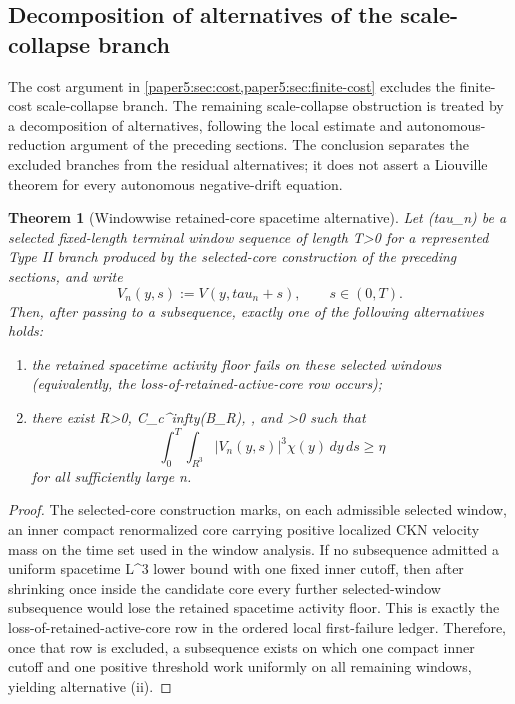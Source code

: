 \documentclass[11pt]{amsart}
\def\({}%
\def\){}%
\def\mathbb#1{#1}%
\def\tau{tau}%
\def\infty{infty}%
\theoremstyle{plain}
\newtheorem{theorem}{Theorem}[section]
\theoremstyle{definition}
\theoremstyle{remark}
\begin{document}
\subsection{Decomposition of alternatives of the scale-collapse branch}
\label{paper5:sec:branch-closure}

The cost argument in \cref{paper5:sec:cost,paper5:sec:finite-cost} excludes the finite-cost scale-collapse branch.  The remaining
scale-collapse obstruction is treated by a decomposition of alternatives, following the local
estimate and autonomous-reduction argument of the preceding sections.  The conclusion separates the excluded branches from the residual alternatives; it does not assert a Liouville theorem for every autonomous negative-drift equation.

\begin{theorem}[Windowwise retained-core spacetime alternative]\label{paper5:thm:core-retention}
Let \((\tau_n)\) be a selected fixed-length terminal window sequence of length \(T>0\) for a represented
Type II branch produced by the selected-core construction of the preceding sections,
and write
\[
  V_n(y,s):=V(y,\tau_n+s),\qquad s\in(0,T).
\]
Then, after passing to a subsequence, exactly one of the following alternatives
holds:
\begin{enumerate}[label=\textup{(\roman*)}]
  \item the retained spacetime activity floor fails on these selected windows
  (equivalently, the loss-of-retained-active-core row occurs);
  \item there exist \(R>0\), \(\chi\in C_c^\infty(B_R)\), \(\chi{}\), and
  \(\eta>0\) such that
  \[
    \int_0^T\int_{\mathbb R^3} |V_n(y,s)|^3\chi(y)\,dy\,ds
    \ge \eta
  \]
  for all sufficiently large \(n\).
\end{enumerate}
\end{theorem}

\begin{proof}
The selected-core construction marks, on each admissible selected window, an
inner compact renormalized core carrying positive localized CKN velocity mass
on the time set used in the window analysis.  If no subsequence admitted a
uniform spacetime \(L^3\) lower bound with one fixed inner cutoff, then after
shrinking once inside the candidate core every further selected-window
subsequence would lose the retained spacetime activity floor.  This is exactly the
loss-of-retained-active-core row in the ordered local first-failure ledger.
Therefore, once that row is excluded, a subsequence exists on which one compact
inner cutoff and one positive threshold work uniformly on all remaining windows,
yielding alternative \textup{(ii)}.
\end{proof}
\end{document}
